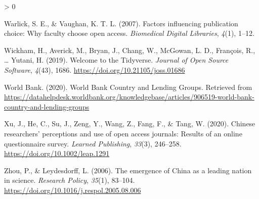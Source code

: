 \documentclass[
  english,
  man]{apa6}
\newlength{\cslhangindent}
\newenvironment{CSLReferences}[2] %
 {%
  \setlength{\parindent}{0pt}
  \ifodd #1 \everypar{\setlength{\hangindent}{\cslhangindent}}\ignorespaces\fi
  \ifnum #2 > 0
  \setlength{\parskip}{#2\baselineskip}
  \fi
 }%
 {}
\begin{document}
\begin{CSLReferences}{1}{0}
\leavevmode\hypertarget{ref-warlick_factors_2007}{}%
Warlick, S. E., \& Vaughan, K. T. L. (2007). Factors influencing publication choice: Why faculty choose open access. \emph{Biomedical Digital Libraries}, \emph{4}(1), 1--12.

\leavevmode\hypertarget{ref-wickham_welcome_2019}{}%
Wickham, H., Averick, M., Bryan, J., Chang, W., McGowan, L. D., François, R., \ldots{} Yutani, H. (2019). Welcome to the {Tidyverse}. \emph{Journal of Open Source Software}, \emph{4}(43), 1686. \url{https://doi.org/10.21105/joss.01686}

\leavevmode\hypertarget{ref-world_bank_world_2020}{}%
World Bank. (2020). World {Bank} {Country} and {Lending} {Groups}. Retrieved from \url{https://datahelpdesk.worldbank.org/knowledgebase/articles/906519-world-bank-country-and-lending-groups}

\leavevmode\hypertarget{ref-xu_chinese_2020}{}%
Xu, J., He, C., Su, J., Zeng, Y., Wang, Z., Fang, F., \& Tang, W. (2020). Chinese researchers' perceptions and use of open access journals: {Results} of an online questionnaire survey. \emph{Learned Publishing}, \emph{33}(3), 246--258. \url{https://doi.org/10.1002/leap.1291}

\leavevmode\hypertarget{ref-zhou_emergence_2006}{}%
Zhou, P., \& Leydesdorff, L. (2006). The emergence of {China} as a leading nation in science. \emph{Research Policy}, \emph{35}(1), 83--104. \url{https://doi.org/10.1016/j.respol.2005.08.006}

\end{CSLReferences}

\endgroup
\end{document}
